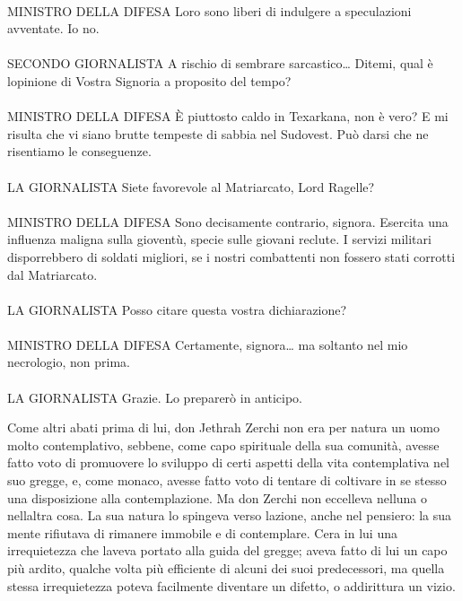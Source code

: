 {\begin{flushleft}
			\leavevmode\\
			MINISTRO DELLA DIFESA Loro sono liberi di indulgere a speculazioni
			avventate. Io no.
			\leavevmode\\
			\leavevmode\\
			SECONDO GIORNALISTA A rischio di sembrare sarcastico\ldots{} Ditemi,
			qual è l\textquotesingle opinione di Vostra Signoria a proposito del
			tempo?
			\leavevmode\\
			\leavevmode\\
			MINISTRO DELLA DIFESA È piuttosto caldo in Texarkana, non è vero? E mi
			risulta che vi siano brutte tempeste di sabbia nel Sudovest. Può darsi
			che ne risentiamo le conseguenze.
			\leavevmode\\
			\leavevmode\\
			LA GIORNALISTA Siete favorevole al Matriarcato, Lord Ragelle?
			\leavevmode\\
			\leavevmode\\
			MINISTRO DELLA DIFESA Sono decisamente contrario, signora. Esercita una
			influenza maligna sulla gioventù, specie sulle giovani reclute. I
			servizi militari disporrebbero di soldati migliori, se i nostri
			combattenti non fossero stati corrotti dal Matriarcato.
			\leavevmode\\
			\leavevmode\\
			LA GIORNALISTA Posso citare questa vostra dichiarazione?
			\leavevmode\\
			\leavevmode\\
			MINISTRO DELLA DIFESA Certamente, signora\ldots{} ma soltanto nel mio
			necrologio, non prima.
			\leavevmode\\
			\leavevmode\\
			LA GIORNALISTA Grazie. Lo preparerò in anticipo.	
	\end{flushleft}}
	
	
	Come altri abati prima di lui, don Jethrah Zerchi non era per natura un
	uomo molto contemplativo, sebbene, come capo spirituale della sua
	comunità, avesse fatto voto di promuovere lo sviluppo di certi aspetti
	della vita contemplativa nel suo gregge, e, come monaco, avesse fatto
	voto di tentare di coltivare in se stesso una disposizione alla
	contemplazione. Ma don Zerchi non eccelleva nell\textquotesingle una o
	nell\textquotesingle altra cosa. La sua natura lo spingeva verso
	l\textquotesingle azione, anche nel pensiero: la sua mente rifiutava di
	rimanere immobile e di contemplare. C\textquotesingle era in lui una
	irrequietezza che l\textquotesingle aveva portato alla guida del gregge;
	aveva fatto di lui un capo più ardito, qualche volta più efficiente di
	alcuni dei suoi predecessori, ma quella stessa irrequietezza poteva
	facilmente diventare un difetto, o addirittura un vizio.
	
